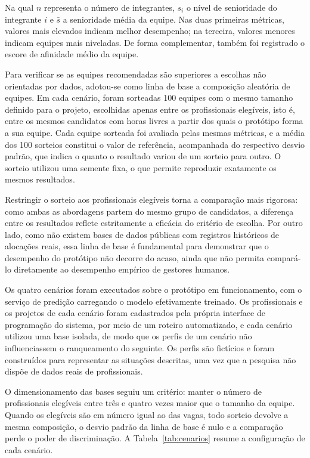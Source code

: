 Na qual $n$ representa o número de integrantes, $s_i$ o nível de senioridade do integrante $i$ e $\bar{s}$ a senioridade média da equipe. Nas duas primeiras métricas, valores mais elevados indicam melhor desempenho; na terceira, valores menores indicam equipes mais niveladas. De forma complementar, também foi registrado o escore de afinidade médio da equipe.

Para verificar se as equipes recomendadas são superiores a escolhas não orientadas por dados, adotou-se como linha de base a composição aleatória de equipes. Em cada cenário, foram sorteadas 100 equipes com o mesmo tamanho definido para o projeto, escolhidas apenas entre os profissionais elegíveis, isto é, entre os mesmos candidatos com horas livres a partir dos quais o protótipo forma a sua equipe. Cada equipe sorteada foi avaliada pelas mesmas métricas, e a média dos 100 sorteios constitui o valor de referência, acompanhada do respectivo desvio padrão, que indica o quanto o resultado variou de um sorteio para outro. O sorteio utilizou uma semente fixa, o que permite reproduzir exatamente os mesmos resultados.

Restringir o sorteio aos profissionais elegíveis torna a comparação mais rigorosa: como ambas as abordagens partem do mesmo grupo de candidatos, a diferença entre os resultados reflete estritamente a eficácia do critério de escolha. Por outro lado, como não existem bases de dados públicas com registros históricos de alocações reais, essa linha de base é fundamental para demonstrar que o desempenho do protótipo não decorre do acaso, ainda que não permita compará-lo diretamente ao desempenho empírico de gestores humanos.

Os quatro cenários foram executados sobre o protótipo em funcionamento, com o serviço de predição carregando o modelo efetivamente treinado. Os profissionais e os projetos de cada cenário foram cadastrados pela própria interface de programação do sistema, por meio de um roteiro automatizado, e cada cenário utilizou uma base isolada, de modo que os perfis de um cenário não influenciassem o ranqueamento do seguinte. Os perfis são fictícios e foram construídos para representar as situações descritas, uma vez que a pesquisa não dispõe de dados reais de profissionais.

O dimensionamento das bases seguiu um critério: manter o número de profissionais elegíveis entre três e quatro vezes maior que o tamanho da equipe. Quando os elegíveis são em número igual ao das vagas, todo sorteio devolve a mesma composição, o desvio padrão da linha de base é nulo e a comparação perde o poder de discriminação. A Tabela~\ref{tab:cenarios} resume a configuração de cada cenário.

